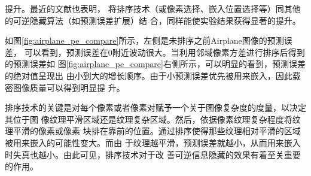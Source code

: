 提升。最近的文献也表明\cite{sachnev2009reversible,hong2012adaptive}，
将排序技术（或像素选择、嵌入位置选择等）同其他的可逆隐藏算法（如预测误差扩展）结
合，同样能使实验结果获得显著的提升。
\par
如图\ref{fig:airplane_pe_compare}所示，左侧是未排序之前Airplane图像的预测误差，
可以看到，预测误差在0附近波动很大。当利用邻域像素方差进行排序后得到的预测误差如
图\ref{fig:airplane_pe_compare}右侧所示，可以明显的看到，预测误差的绝对值呈现出
由小到大的增长顺序。由于小预测误差优先被用来嵌入，因此载密图像质量可以得到明显提
升。
\par
排序技术的关键是对每个像素或者像素对赋予一个关于图像复杂度的度量，以决定其位于图
像纹理平滑区域还是纹理复杂区域。然后，依据像素纹理复杂程度将纹理平滑的像素或像素
块排在靠前的位置。通过排序使得那些纹理相对平滑的区域被用来嵌入的可能性变大。而由
于纹理越平滑，预测误差就越小，从而用来嵌入时失真也越小。由此可见，排序技术对于改
善可逆信息隐藏的效果有着至关重要的作用。



